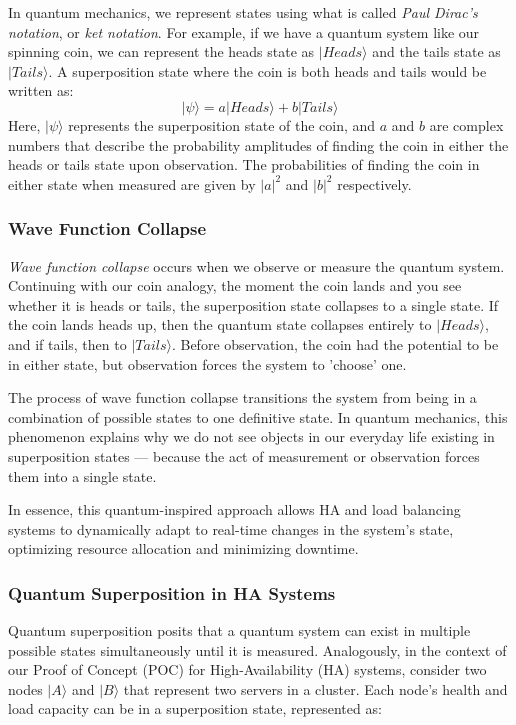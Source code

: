 \documentclass[12pt]{article}
\begin{document}
In quantum mechanics, we represent states using what is called \textit{Paul Dirac's notation}, or \textit{ket notation}. For example, if we have a quantum system like our spinning coin, we can represent the heads state as \(|Heads\rangle\) and the tails state as \(|Tails\rangle\). A superposition state where the coin is both heads and tails would be written as:
\[|\psi\rangle = a|Heads\rangle + b|Tails\rangle\]
Here, \(|\psi\rangle\) represents the superposition state of the coin, and \(a\) and \(b\) are complex numbers that describe the probability amplitudes of finding the coin in either the heads or tails state upon observation. The probabilities of finding the coin in either state when measured are given by \(|a|^2\) and \(|b|^2\) respectively.

\subsubsection{Wave Function Collapse}
\textit{Wave function collapse} occurs when we observe or measure the quantum system. Continuing with our coin analogy, the moment the coin lands and you see whether it is heads or tails, the superposition state collapses to a single state. If the coin lands heads up, then the quantum state collapses entirely to \(|Heads\rangle\), and if tails, then to \(|Tails\rangle\). Before observation, the coin had the potential to be in either state, but observation forces the system to 'choose' one.

The process of wave function collapse transitions the system from being in a combination of possible states to one definitive state. In quantum mechanics, this phenomenon explains why we do not see objects in our everyday life existing in superposition states — because the act of measurement or observation forces them into a single state.

In essence, this quantum-inspired approach allows HA and load balancing systems to dynamically adapt to real-time changes in the system's state, optimizing resource allocation and minimizing downtime.

\subsubsection{Quantum Superposition in HA Systems}
Quantum superposition posits that a quantum system can exist in multiple possible states simultaneously until it is measured. Analogously, in the context of our Proof of Concept (POC) for High-Availability (HA) systems, consider two nodes \(|A\rangle\) and \(|B\rangle\) that represent two servers in a cluster. Each node's health and load capacity can be in a superposition state, represented as:
\end{document}
